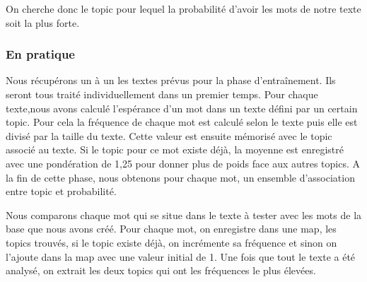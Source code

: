 On cherche donc le topic pour lequel la probabilité d'avoir les mots de notre texte soit la plus forte.


\subsubsection{En pratique}
  Nous récupérons un à un les textes prévus pour la phase d'entraînement. Ils seront tous traité individuellement dans un premier temps. Pour chaque texte,nous avons calculé l'espérance d'un mot dans un texte défini par un certain topic. Pour cela la fréquence de chaque mot est calculé selon le texte puis elle est divisé par la taille du texte. Cette valeur est ensuite mémorisé avec le topic associé au texte. Si le topic pour ce mot existe déjà, la moyenne est enregistré avec une pondération de 1,25 pour donner plus de poids face aux autres topics. A la fin de cette phase, nous obtenons pour chaque mot, un ensemble d'association entre topic et probabilité. 


  Nous comparons chaque mot qui se situe dans le texte à tester avec les mots de la base que nous avons créé. Pour chaque mot, on enregistre dans une map, les topics trouvés, si le topic existe déjà, on incrémente sa fréquence et sinon on l'ajoute dans la map avec une valeur initial de 1. Une fois que tout le texte a été analysé, on extrait les deux topics qui ont les fréquences le plus élevées.
